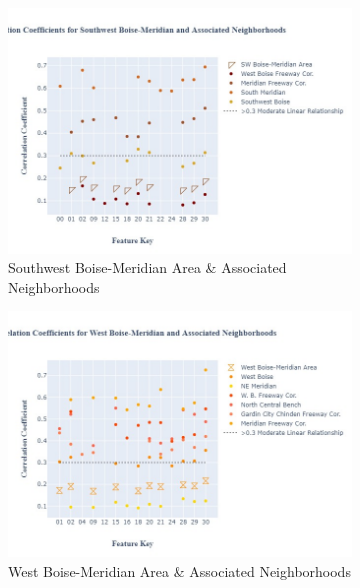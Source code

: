 \documentclass{article}
\begin{document}
\begin{figure}[H]
\begin{subfigure}[b]{0.45\textwidth}
         \includegraphics[width=\textwidth]{images/SWBM_fig.jpg}
         \caption{Southwest Boise-Meridian Area \& Associated Neighborhoods}
         \label{fig: swbm_ccg}
     \end{subfigure}
               \begin{subfigure}[b]{0.45\textwidth}
         \centering
         \includegraphics[width=\textwidth]{images/WBM_fig.jpg}
         \caption{West Boise-Meridian Area \& Associated Neighborhoods}
         \label{fig: wbm_ccg}
     \end{subfigure}
               \begin{subfigure}[b]{0.45\textwidth}
         \centering

\end{subfigure}
\end{figure}
\end{document}
